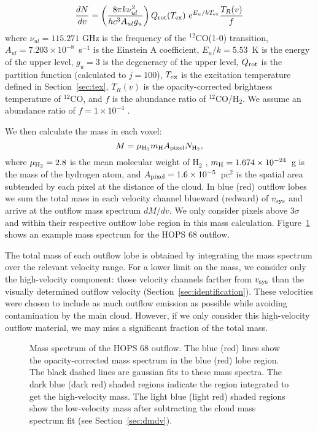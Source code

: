 \documentclass[twocolumn]{aastex63}
\newcommand{\example}{HOPS 68}
\newcommand{\co}[1][]{\ensuremath{^{#1}}CO}
\begin{document}
\begin{equation}\label{eq:dNdv}
\frac{dN}{dv} = \left(\frac{8\pi k \nu^2_{ul}}{h c^3 A_{ul} g_u}\right) Q_{\rm rot}(T_{\rm ex})~ e^{E_u / kT_{\rm ex}} \frac{T_R(v)}{f}
\end{equation}
where $\nu_{ul} = 115.271$ GHz is the frequency of the \co[12](1-0) transition, $A_{ul} = 7.203 \times 10^{-8}$~s$^{-1}$ is the Einstein A coefficient, $E_u/k = 5.53$~K is the energy of the upper level, $g_u = 3$ is the degeneracy of the upper level, $Q_{\rm rot}$ is the partition function (calculated to $j=100$), $T_{\rm ex}$ is the excitation temperature defined in Section~\ref{sec:tex}, $T_R(v)$ is the opacity-corrected brightness temperature of \co[12]{}, and $f$ is the abundance ratio of 
\co[12]/H$_{2}$. We assume an abundance ratio of $f = 1 \times 10 ^{-4}$ \citep{Frerking82}.

We then calculate the mass in each voxel:
\begin{equation}\label{eq:mass}
M = \mu_{\rm H_2} m_{\rm H} A_{\rm pixel} N_{\rm H_2},
\end{equation}
where $\mu_{\rm H_2} = 2.8$ is the mean molecular weight of H$_2$ \citep{Kauffmann08}, $m_{\rm H} = 1.674 \times 10^{-24}$~g is the mass of the hydrogen atom, and $A_{\rm pixel} = 1.6 \times 10^{-5}$~pc$^2$ is the spatial area subtended by each pixel at the distance of the cloud. In blue (red) outflow lobes we sum the total mass in each velocity channel blueward (redward) of $v_{\rm sys}$ and arrive at the outflow mass spectrum $dM/dv$. We only consider pixels above $3\sigma$ and within their respective outflow lobe region in this mass calculation. Figure~\ref{fig:dmdv} shows an example mass spectrum for the \example{} outflow.

The total mass of each outflow lobe is obtained by integrating the mass spectrum over the relevant velocity range. For a lower limit on the mass, we consider only the high-velocity component: those velocity channels farther from $v_{\rm sys}$ than the visually determined outflow velocity (Section~\ref{sec:identification}). These velocities were chosen to include as much outflow emission as possible while avoiding contamination by the main cloud. However, if we only consider this high-velocity outflow material, we may miss a significant fraction of the total mass.

\begin{figure}
\caption{Mass spectrum of the \example{} outflow. The blue (red) lines show the opacity-corrected mass spectrum in the blue (red) lobe region. The black dashed lines are gaussian fits to these mass spectra. The dark blue (dark red) shaded regions indicate the region integrated to get the high-velocity mass. The light blue (light red) shaded regions show the low-velocity mass after subtracting the cloud mass spectrum fit (see Section~\ref{sec:dmdv}).\label{fig:dmdv}}
\end{figure}
\end{document}
